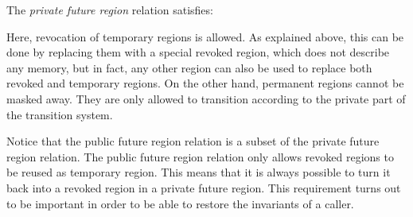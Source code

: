 \documentclass[acmsmall,review]{acmart}\settopmatter{printfolios=true}
\newcommand{\var}[1]{\mathit{#1}}
\newcommand{\pub}{\var{pub}}
\newcommand{\futurestr}{\mathbin{\sqsupseteq}^{\var{priv}}}
\newcommand{\plaindom}[1]{\mathrm{#1}}
\newcommand{\Regions}{\plaindom{Region}}
\newcommand{\plainview}[1]{\mathrm{#1}}
\newcommand{\temp}{\plainview{temp}}
\newcommand{\revoked}{\plainview{revoked}}
\begin{document}
The \emph{private future region} relation satisfies:
Here, revocation of temporary regions is allowed. As explained above, this can
be done by replacing them with a special revoked region, which does not describe
any memory, but in fact, any other region can also be used to replace both
revoked and temporary regions. On the other hand, permanent regions cannot be
masked away. They are only allowed to transition according to the private part
of the transition system.

Notice that the public future region relation is a subset of the private future
region relation. The public future region relation only allows revoked regions
to be reused as temporary region. This means that it is always possible to turn
it back into a revoked region in a private future region. This requirement turns
out to be important in order to be able to restore the invariants of a caller.



\end{document}
